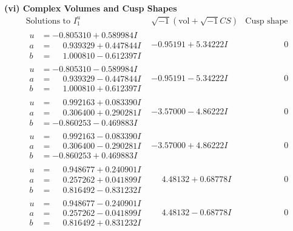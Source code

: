 \documentclass[1p]{elsarticle_modified}
\theoremstyle{definition}
\newcommand{\I}{\sqrt{-1}}
\begin{document}
\newpage\flushleft \textbf{(vi) Complex Volumes and Cusp Shapes}
$$\begin{array}{c|c|c}  
\text{Solutions to }I^u_{1}& \I (\text{vol} + \sqrt{-1}CS) & \text{Cusp shape}\\
 \hline 
\begin{aligned}
u &= -0.805310 + 0.589984 I \\
a &= \phantom{-}0.939329 + 0.447844 I \\
b &= \phantom{-}1.000810 - 0.612397 I\end{aligned}
 & -0.95191 + 5.34222 I & \phantom{-0.000000 } 0 \\ \hline\begin{aligned}
u &= -0.805310 - 0.589984 I \\
a &= \phantom{-}0.939329 - 0.447844 I \\
b &= \phantom{-}1.000810 + 0.612397 I\end{aligned}
 & -0.95191 - 5.34222 I & \phantom{-0.000000 } 0 \\ \hline\begin{aligned}
u &= \phantom{-}0.992163 + 0.083390 I \\
a &= \phantom{-}0.306400 + 0.290281 I \\
b &= -0.860253 - 0.469883 I\end{aligned}
 & -3.57000 - 4.86222 I & \phantom{-0.000000 } 0 \\ \hline\begin{aligned}
u &= \phantom{-}0.992163 - 0.083390 I \\
a &= \phantom{-}0.306400 - 0.290281 I \\
b &= -0.860253 + 0.469883 I\end{aligned}
 & -3.57000 + 4.86222 I & \phantom{-0.000000 } 0 \\ \hline\begin{aligned}
u &= \phantom{-}0.948677 + 0.240901 I \\
a &= \phantom{-}0.257262 + 0.041899 I \\
b &= \phantom{-}0.816492 - 0.831232 I\end{aligned}
 & \phantom{-}4.48132 + 0.68778 I & \phantom{-0.000000 } 0 \\ \hline\begin{aligned}
u &= \phantom{-}0.948677 - 0.240901 I \\
a &= \phantom{-}0.257262 - 0.041899 I \\
b &= \phantom{-}0.816492 + 0.831232 I\end{aligned}
 & \phantom{-}4.48132 - 0.68778 I & \phantom{-0.000000 } 0 \\ \hline\begin{aligned}

\end{aligned}
\end{array}$$
\end{document}

